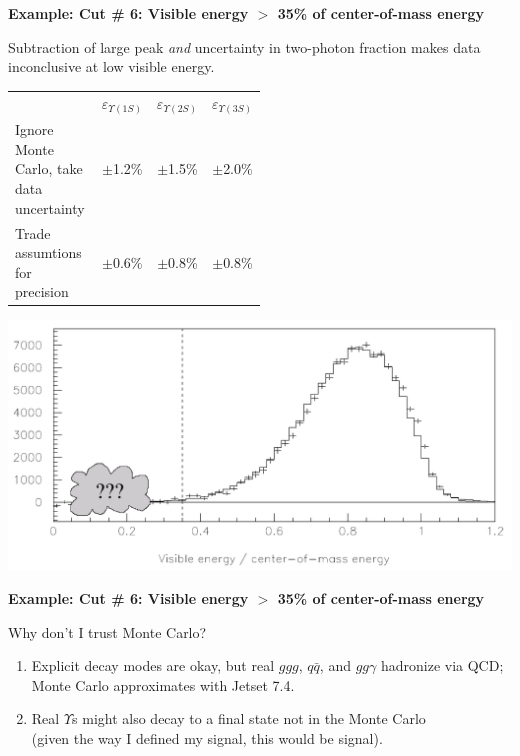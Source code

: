 \documentclass[landscape]{article}
\begin{document}
\pagebreak

{\bf Example: Cut \# 6: Visible energy $>$ 35\% of center-of-mass energy}

\vfill

Subtraction of large peak {\it and} uncertainty in two-photon fraction
makes data inconclusive at low visible energy.

\vspace{-0.5 cm}
\begin{center}\renewcommand{\arraystretch}{1.2}
  \begin{tabular}{p{0.5\linewidth} c c c}
  & $\varepsilon_{\Upsilon(1S)}$ & $\varepsilon_{\Upsilon(2S)}$ & $\varepsilon_{\Upsilon(3S)}$ \\
  Ignore Monte Carlo, take data uncertainty & $\pm$1.2\% & $\pm$1.5\% & $\pm$2.0\% \\
  Trade assumtions for precision  & $\pm$0.6\% & $\pm$0.8\% & $\pm$0.8\% \\
  \end{tabular}
\renewcommand{\arraystretch}{1}\end{center}

\vfill

\includegraphics[width=\linewidth]{visen2.pdf}

\pagebreak

{\bf Example: Cut \# 6: Visible energy $>$ 35\% of center-of-mass energy}

\vfill

\begin{center} Why don't I trust Monte Carlo? \end{center}

\vspace{0.5 cm}

\begin{enumerate}\setlength{\itemsep}{0.5 cm}

  \item Explicit decay modes are okay, but real $ggg$, $q\bar{q}$, and
  $gg\gamma$ hadronize via QCD; \\ Monte Carlo approximates with
  Jetset 7.4.

  \item Real $\Upsilon$s might also decay to a final state not in the
  Monte Carlo \\ (given the way I defined my signal, this would be
  signal).

\end{enumerate}
\end{document}
